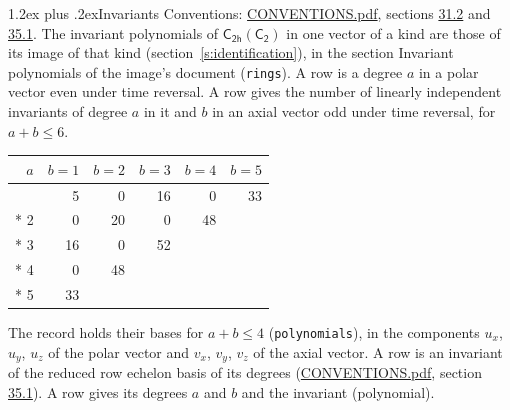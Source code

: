 \documentclass[10pt,a4paper]{article}
\makeatletter
\renewcommand\section{\@startsection{section}{1}{\z@}{-3ex plus -1ex minus -.2ex}%
  {1.2ex plus .2ex}{\normalfont\large\sffamily\bfseries\color{parttitle}}}
\numberwithin{equation}{section}
\newcommand{\grp}[1]{\mathsf{#1}}
\makeatother
\begin{document}
\section{Invariants}\label{s:invariants}
Conventions: \href{../../CONVENTIONS.pdf}{CONVENTIONS.pdf}, sections \href{../../CONVENTIONS.pdf\#conv.31.2}{31.2} and \href{../../CONVENTIONS.pdf\#conv.35.1}{35.1}.
The invariant polynomials of $\grp{C_{2h}}(\grp{C_{2}})$ in one vector of a kind are those of its image of that kind (section~\ref{s:identification}), in the section Invariant polynomials of the image's document (\texttt{rings}).
\leavevmode\label{n:index.degree.polar}\label{n:index.degree.axial}A row is a degree $a$ in a polar vector even under time reversal. A row gives the number of linearly independent invariants of degree $a$ in it and $b$ in an axial vector odd under time reversal, for $a + b \le 6$.
{\small\begin{longtable}{@{}rrrrrr@{}}\toprule
$a$ & $b = 1$ & $b = 2$ & $b = 3$ & $b = 4$ & $b = 5$\\\midrule\endhead
\bottomrule\endfoot\endlastfoot
1 & 5 & 0 & 16 & 0 & 33\\*
2 & 0 & 20 & 0 & 48 & \\*
3 & 16 & 0 & 52 &  & \\*
4 & 0 & 48 &  &  & \\*
5 & 33 &  &  &  & \\
\bottomrule\end{longtable}}
\leavevmode\label{n:local.component.polar}\label{n:local.component.axial}The record holds their bases for $a + b \le 4$ (\texttt{polynomials}), in the components $u_{x}$, $u_{y}$, $u_{z}$ of the polar vector and $v_{x}$, $v_{y}$, $v_{z}$ of the axial vector. \label{n:head.polynomial}A row is an invariant of the reduced row echelon basis of its degrees (\href{../../CONVENTIONS.pdf}{CONVENTIONS.pdf}, section \href{../../CONVENTIONS.pdf\#conv.35.1}{35.1}). A row gives its degrees $a$ and $b$ and the invariant (polynomial).
\end{document}
